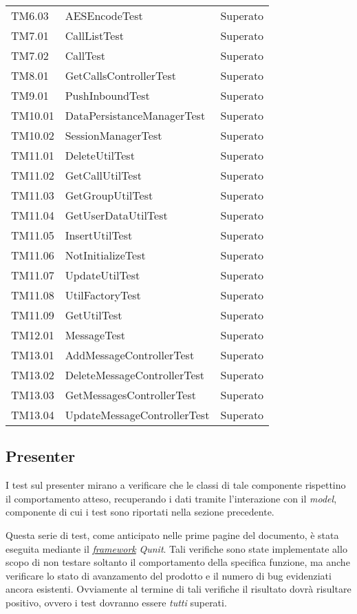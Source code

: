 \begin{center}
\begin{longtable}{p{}ll}
TM6.03 & AESEncodeTest &Superato\\
TM7.01 & CallListTest &Superato\\
TM7.02 & CallTest &Superato\\
TM8.01 & GetCallsControllerTest &Superato\\
TM9.01 & PushInboundTest &Superato\\
TM10.01 & DataPersistanceManagerTest &Superato\\
TM10.02 & SessionManagerTest &Superato\\
TM11.01 & DeleteUtilTest &Superato\\
TM11.02 & GetCallUtilTest &Superato\\
TM11.03 & GetGroupUtilTest &Superato\\
TM11.04 & GetUserDataUtilTest &Superato\\
TM11.05 & InsertUtilTest &Superato\\
TM11.06 & NotInitializeTest &Superato\\
TM11.07 & UpdateUtilTest &Superato\\
TM11.08 & UtilFactoryTest &Superato\\
TM11.09 & GetUtilTest &Superato\\
TM12.01 & MessageTest &Superato\\
TM13.01 & AddMessageControllerTest &Superato\\
TM13.02 & DeleteMessageControllerTest &Superato\\
TM13.03 & GetMessagesControllerTest &Superato\\
TM13.04 & UpdateMessageControllerTest &Superato\\
\bottomrule
\end{longtable}
\end{center}

\subsection{Presenter}
I test sul presenter mirano a verificare che le classi di tale componente rispettino il comportamento atteso, recuperando i dati tramite l'interazione con il \textit{model}, componente di cui i test sono riportati nella sezione precedente.

Questa serie di test, come anticipato nelle prime pagine del documento, è stata eseguita mediante il \underline{\textit{framework}} \textit{Qunit}. Tali verifiche sono state implementate allo scopo di non testare soltanto il comportamento della specifica funzione, ma anche verificare lo stato di avanzamento del prodotto e il numero di bug evidenziati ancora esistenti.
Ovviamente al termine di tali verifiche il risultato dovrà risultare positivo, ovvero i test dovranno essere \textit{tutti} superati.


